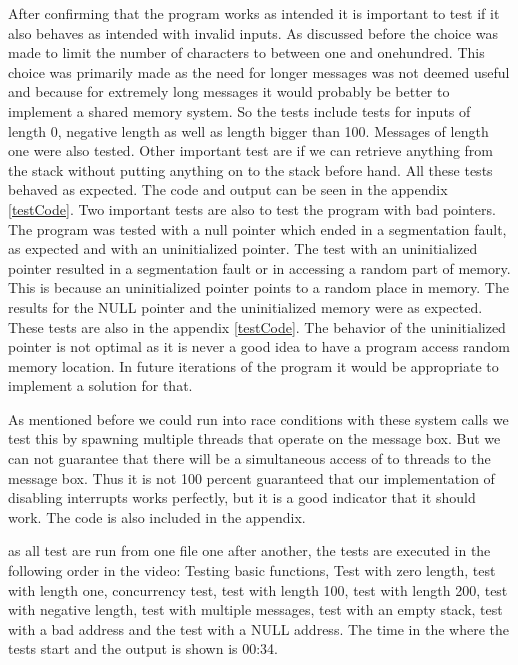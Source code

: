 \documentclass[12pt,a4paper]{report}
\begin{document}
After confirming that the program works as intended it is important to test if it also behaves as intended with invalid inputs. As discussed before the choice was made to limit the number of characters to between one and onehundred. This choice was primarily made as the need for longer messages was not deemed useful and because for extremely long messages it would probably be better to implement a shared memory system. So the tests include tests for inputs of length 0, negative length as well as length bigger than 100. Messages of length one were also tested. Other important test are if we can retrieve anything from the stack without putting anything on to the stack before hand. All these tests behaved as expected. The code and output can be seen in the appendix \ref{testCode}. Two important tests are also to test the program with bad pointers. The program was tested with a null pointer which ended in a segmentation fault, as expected and with an uninitialized pointer. The test with an uninitialized pointer resulted in a segmentation fault or in accessing a random part of memory. This is because an uninitialized pointer points to a random place in memory. The results for the NULL pointer and the uninitialized memory were as expected. These tests are also in the appendix \ref{testCode}. The behavior of the uninitialized pointer is not optimal as it is never a good idea to have a program access random memory location. In future iterations of the program it would be appropriate to implement a solution for that.

As mentioned before we could run into race conditions with these system calls we test this by spawning multiple threads that operate on the message box. But we can not guarantee that there will be a simultaneous access of to threads to the message box. Thus it is not 100 percent guaranteed that our implementation of disabling interrupts works perfectly, but it is a good indicator that it should work. The code is also included in the appendix.

as all test are run from one file one after another, the tests are executed in the following order in the video: Testing basic functions, Test with zero length, test with length one, concurrency test, test with length 100, test with length 200, test with negative length, test with multiple messages, test with an empty stack, test with a bad address and the test with a NULL address. The time in the where the tests start and the output is shown is 00:34.
\end{document}
